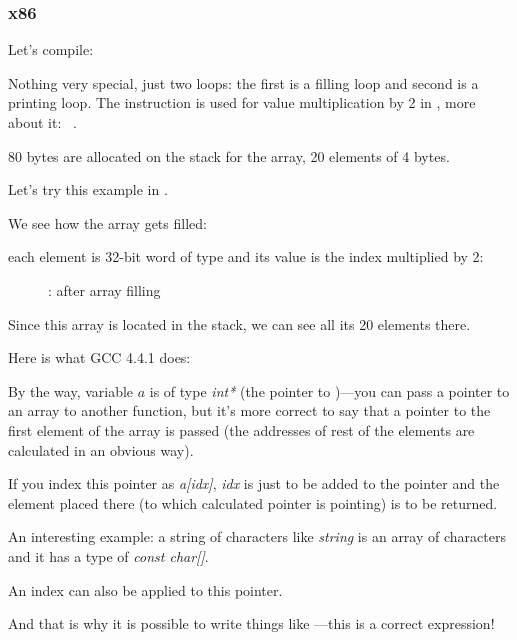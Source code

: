 \subsubsection{x86}


Let's compile:




Nothing very special, just two loops: the first is a filling loop and second is a printing loop.
The  instruction is used for value multiplication by 2 in \ECX, more about it: ~.

80 bytes are allocated on the stack for the array, 20 elements of 4 bytes.

\clearpage
Let's try this example in \olly.
\myindex{\olly}

We see how the array gets filled: 

each element is 32-bit word of \Tint type and its value is the index multiplied by 2:

\begin{figure}[H]
\centering
{}
\caption{\olly: after array filling}
\label{fig:array_simple_olly}
\end{figure}

Since this array is located in the stack, we can see all its 20 elements there.


Here is what GCC 4.4.1 does:



By the way, variable $a$ is of type  \emph{int*} 
(the pointer to \Tint{})---you can pass a pointer to an array to another function,
but it's more correct to say that a pointer to the first element of the array is passed
(the addresses of rest of the elements are calculated in an obvious way).

If you index this pointer as \emph{a[idx]}, \emph{idx} is just to be added to the pointer 
and the element placed there (to which calculated pointer is pointing) is to be returned.

An interesting example: a string of characters like 
\emph{string} is an array of characters and it has a type of \emph{const char[]}.

An index can also be applied to this pointer.

And that is why it is possible to write things like ---this is a correct \CCpp expression!

